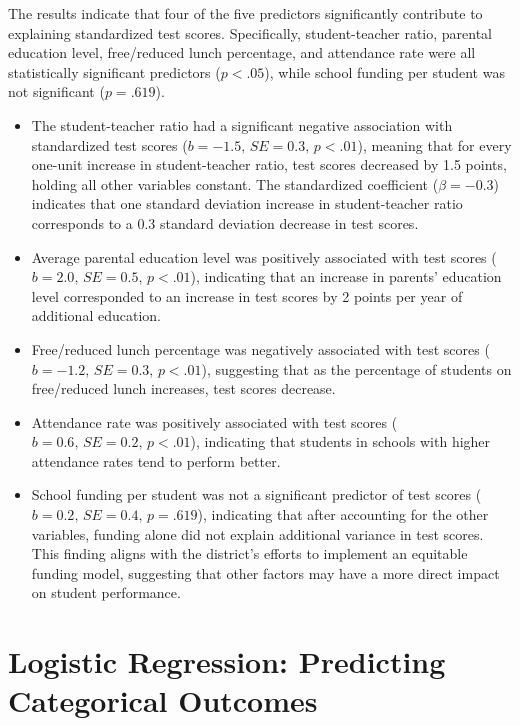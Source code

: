 \documentclass[
  letterpaper,
  DIV=11,
  numbers=noendperiod]{scrreprt}
\begin{document}
The results indicate that four of the five predictors significantly
contribute to explaining standardized test scores. Specifically,
student-teacher ratio, parental education level, free/reduced lunch
percentage, and attendance rate were all statistically significant
predictors (\(p < .05\)), while school funding per student was not
significant (\(p = .619\)).

\begin{itemize}
\item
  The student-teacher ratio had a significant negative association with
  standardized test scores (\(b = −1.5, \, SE = 0.3, \, p < .01\)),
  meaning that for every one-unit increase in student-teacher ratio,
  test scores decreased by 1.5 points, holding all other variables
  constant. The standardized coefficient (\(\beta = −0.3\)) indicates
  that one standard deviation increase in student-teacher ratio
  corresponds to a 0.3 standard deviation decrease in test scores.
\item
  Average parental education level was positively associated with test
  scores (\(b = 2.0, \, SE = 0.5, \, p < .01\)), indicating that an
  increase in parents' education level corresponded to an increase in
  test scores by 2 points per year of additional education.
\item
  Free/reduced lunch percentage was negatively associated with test
  scores (\(b = −1.2, \, SE = 0.3, \, p < .01\)), suggesting that as the
  percentage of students on free/reduced lunch increases, test scores
  decrease.
\item
  Attendance rate was positively associated with test scores
  (\(b = 0.6, \, SE = 0.2, \, p < .01\)), indicating that students in
  schools with higher attendance rates tend to perform better.
\item
  School funding per student was not a significant predictor of test
  scores (\(b = 0.2, \, SE = 0.4, \, p = .619\)), indicating that after
  accounting for the other variables, funding alone did not explain
  additional variance in test scores. This finding aligns with the
  district's efforts to implement an equitable funding model, suggesting
  that other factors may have a more direct impact on student
  performance.
\end{itemize}

\section{Logistic Regression: Predicting Categorical
Outcomes}\label{logistic-regression-predicting-categorical-outcomes}
\end{document}
